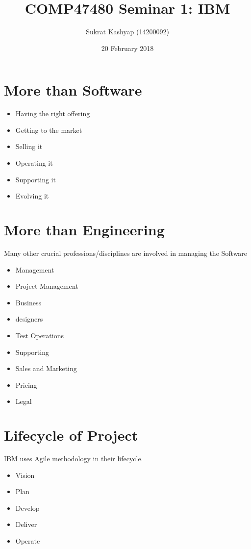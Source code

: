 \documentclass[12pt]{article}
\title{\vspace{-3.0cm}COMP47480 Seminar 1: IBM}
\author{Sukrat Kashyap (14200092)}
\date{20 February 2018}
\begin{document}
\maketitle

\section{More than Software}

\begin{itemize}
    \item Having the right offering
    \item Getting to the market
    \item Selling it
    \item Operating it
    \item Supporting it
    \item Evolving it
\end{itemize}

\section{More than Engineering}

Many other crucial professions/disciplines are involved in managing the Software

\begin{itemize}
    \item Management
    \item Project Management
    \item Business
    \item designers
    \item Test Operations
    \item Supporting
    \item Sales and Marketing
    \item Pricing
    \item Legal
\end{itemize}

\section{Lifecycle of Project}

IBM uses Agile methodology in their lifecycle.

\begin{itemize}
    \item Vision
    \item Plan
    \item Develop
    \item Deliver
    \item Operate
\end{itemize}
\end{document}
